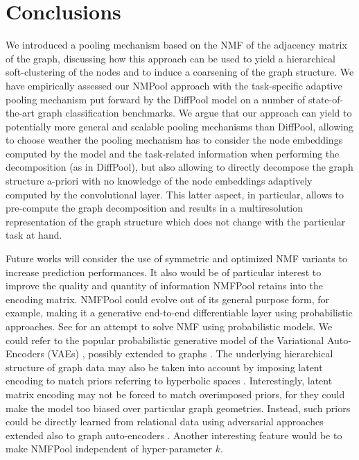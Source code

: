 \documentclass[runningheads]{llncs}
\begin{document}
\section{Conclusions}
We introduced a pooling mechanism based on the NMF of the adjacency matrix of the graph, discussing how this approach can be used to yield a hierarchical soft-clustering of the nodes and to induce a coarsening of the graph structure.  We have empirically assessed our NMPool approach with the task-specific adaptive pooling mechanism put forward by the DiffPool model on a number of state-of-the-art graph classification benchmarks. We argue that our approach can yield to potentially more general and scalable
pooling mechanisms than DiffPool, allowing to choose weather the pooling mechanism has to consider the node embeddings computed by the model and the task-related information when performing the decomposition (as in DiffPool), but also allowing to directly decompose the graph structure a-priori with no knowledge of the node embeddings adaptively computed by the convolutional layer. This latter aspect, in particular, allows to pre-compute the graph decomposition and results in a multiresolution representation of the graph structure which does not change with the particular task at hand.

Future works will consider the use of symmetric and optimized NMF variants to increase prediction performances. It also would be of particular interest to improve the quality and quantity of information NMFPool retains into the encoding matrix. NMFPool could evolve out of its general purpose form, for example, making it a generative end-to-end differentiable layer using probabilistic approaches. See \cite{bayesian-nmf-lio} for an attempt to solve NMF using probabilistic models. We could refer to the popular probabilistic generative model of the Variational Auto-Encoders (VAEs) \cite{2013arXiv1312.6114K}, \cite{pmlr-v32-rezende14} possibly extended to graphs \cite{2016arXiv161107308K}. The underlying hierarchical structure of graph data may also be taken into account by imposing latent encoding to match priors referring to hyperbolic spaces \cite{2019arXiv190106033M}. Interestingly, latent matrix encoding may not be forced to match overimposed priors, for they could make the model too biased over particular graph geometries. Instead, such priors could be directly learned from relational data using adversarial approaches \cite{DBLP:journals/corr/MeschederNG17} extended also to graph auto-encoders \cite{DBLP:journals/corr/abs-1802-04407}. Another interesting feature would be to make NMFPool independent of hyper-parameter $k$.
\end{document}
